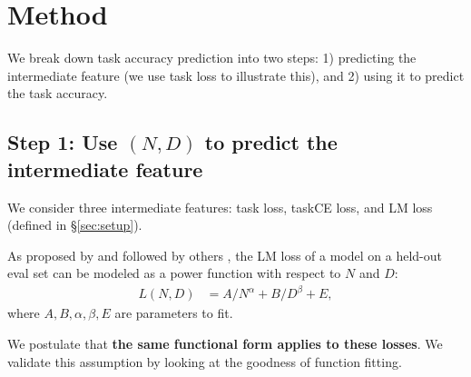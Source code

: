 

% 

\section{Method}
\label{sec:method}

We break down task accuracy prediction into two steps: 1) predicting the intermediate feature (we use task loss to illustrate this), and 2) using it to predict the task accuracy.


\subsection{Step 1: Use $(N, D)$ to predict the intermediate feature}
\label{sec:nd_to_loss}

We consider three intermediate features: task loss, taskCE loss, and LM loss (defined in \S\ref{sec:setup}).

As proposed by \citet{Hoffmann2022TrainingCL} and followed by others \citep{Muennighoff2023ScalingDL,Gadre2024LanguageMS,Zhang2024MAPNeoHC}, the LM loss of a model on a held-out eval set can be modeled as a power function with respect to $N$ and $D$:
\begin{align}
L(N, D) &= A / N^\alpha + B / D^\beta + E,
\label{eqn:power}
\end{align}
where $A, B, \alpha, \beta, E$ are parameters to fit.

We postulate that \textbf{the same functional form applies to these losses}.
We validate this assumption by looking at the goodness of function fitting.

